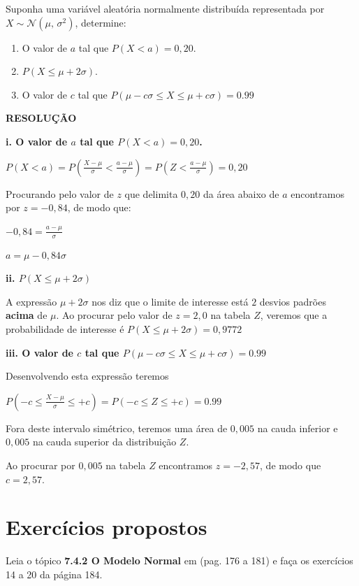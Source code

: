 \documentclass[
]{book}
\providecommand{\tightlist}{%
  \setlength{\itemsep}{0pt}\setlength{\parskip}{0pt}}
\begin{document}
Suponha uma variável aleatória normalmente distribuída representada por \(X \sim \mathcal{N}(\mu,\,\sigma^2)\), determine:

\begin{enumerate}
\def\labelenumi{\roman{enumi}.}
\tightlist
\item
  O valor de \(a\) tal que \(P(X < a) = 0,20\).
\item
  \(P(X \le \mu + 2\sigma)\).
\item
  O valor de \(c\) tal que \(P(\mu -c\sigma \le X \le \mu +c\sigma) = 0.99\)
\end{enumerate}

\textbf{RESOLUÇÃO}

\textbf{i. O valor de \(a\) tal que \(P(X < a) = 0,20\).}

\(P(X < a) = P(\frac{X - \mu}{\sigma} < \frac{a - \mu}{\sigma}) = P(Z < \frac{a - \mu}{\sigma}) = 0,20\)

Procurando pelo valor de \(z\) que delimita \(0,20\) da área abaixo de \(a\) encontramos por \(z = -0,84\), de modo que:

\(-0,84 = \frac{a - \mu}{\sigma}\)

\(a = \mu -0,84\sigma\)

\textbf{ii. \(P(X \le \mu + 2\sigma)\)}

A expressão \(\mu + 2\sigma\) nos diz que o limite de interesse está \(2\) desvios padrões \textbf{acima} de \(\mu\). Ao procurar pelo valor de \(z = 2,0\) na tabela \(Z\), veremos que a probabilidade de interesse é \(P(X \le \mu + 2\sigma) = 0,9772\)

\textbf{iii. O valor de \(c\) tal que \(P(\mu -c\sigma \le X \le \mu +c\sigma) = 0.99\)}

Desenvolvendo esta expressão teremos

\(P(-c \le \frac{X - \mu}{\sigma} \le +c) = P(-c \le Z \le +c) = 0.99\)

Fora deste intervalo simétrico, teremos uma área de \(0,005\) na cauda inferior e \(0,005\) na cauda superior da distribuição \(Z\).

Ao procurar por \(0,005\) na tabela \(Z\) encontramos \(z = -2,57\), de modo que \(c = 2,57\).

\hypertarget{exercuxedcios-propostos}{%
\section{Exercícios propostos}\label{exercuxedcios-propostos}}

Leia o tópico \textbf{7.4.2 O Modelo Normal} em \citep{bussabemoretin6a} (pag. 176 a 181) e faça os exercícios 14 a 20 da página 184.
\end{document}
